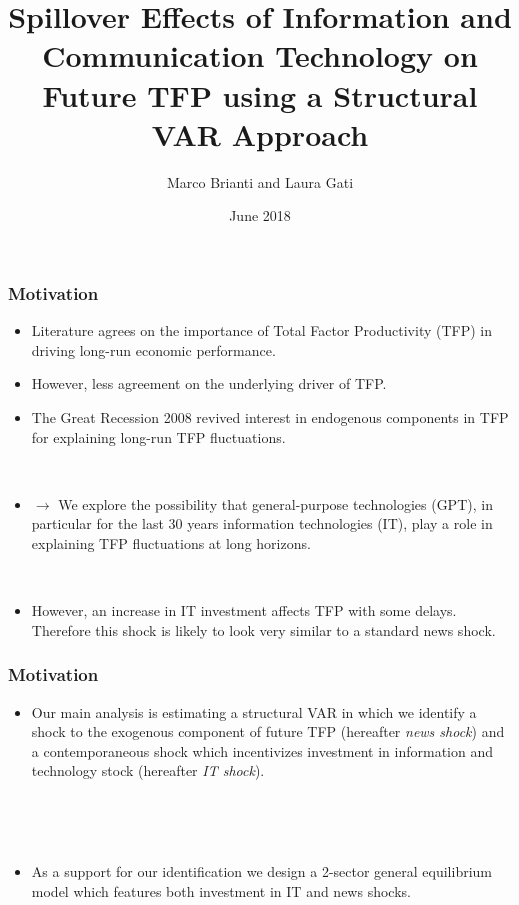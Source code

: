 \documentclass{beamer}
\author[Brianti, Gati]{Marco Brianti and Laura Gati}
\institute[Boston College]{Boston College}
\title{Spillover Effects of Information and Communication Technology on Future TFP using a Structural VAR Approach}
\date{June 2018}
\begin{document}
\begin{frame}

\maketitle


\end{frame}


\begin{frame}
	\frametitle{Motivation}
	
	\begin{itemize}
		
		\item Literature agrees on the importance of Total Factor Productivity (TFP) in driving long-run economic performance.
		
		\item However, less agreement on the underlying driver of TFP.
		
	\item The Great Recession 2008 revived interest in endogenous components in TFP for explaining long-run TFP fluctuations.
	
	\
	
	\item[] $\rightarrow$ We explore the possibility that general-purpose technologies (GPT), in particular for the last 30 years information technologies (IT), play a role in explaining TFP fluctuations at long horizons. 
	
	\
	
	\item However, an increase in IT investment affects TFP with some delays. Therefore this shock is likely to look very similar to a standard news shock.
	
	\end{itemize} 

\end{frame}

\begin{frame}
	\frametitle{Motivation}
	
	\begin{itemize}
	\item Our main analysis is estimating a structural VAR in which we identify a shock to the exogenous component of future TFP (hereafter \textit{news shock}) and a contemporaneous shock which incentivizes investment in information and technology stock (hereafter \textit{IT shock}).
	
	\
	
	\
	
	
    \item As a support for our identification we design a 2-sector general equilibrium model which features both investment in IT and news shocks.
	
	\end{itemize} 

\end{frame}
\end{document}
